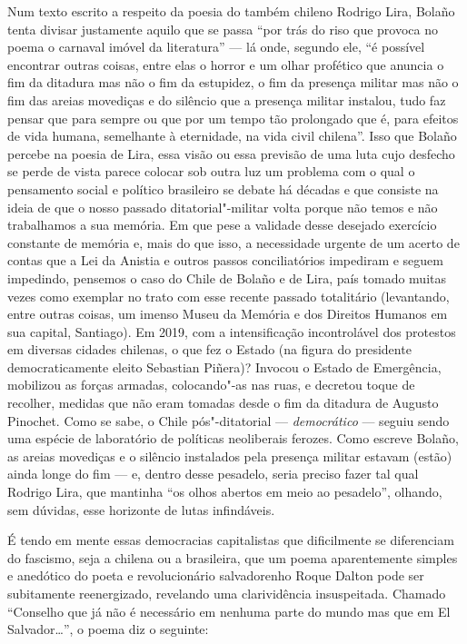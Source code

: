 \asterisc

Num texto escrito a respeito da poesia do também chileno Rodrigo Lira,
Bolaño tenta divisar justamente aquilo que se passa ``por trás do riso
que provoca no poema o carnaval imóvel da literatura'' --- lá onde,
segundo ele, ``é possível encontrar outras coisas, entre elas o horror e
um olhar profético que anuncia o fim da ditadura mas não o fim da
estupidez, o fim da presença militar mas não o fim das areias movediças
e do silêncio que a presença militar instalou, tudo faz pensar que para
sempre ou que por um tempo tão prolongado que é, para efeitos de vida
humana, semelhante à eternidade, na vida civil chilena''. Isso que
Bolaño percebe na poesia de Lira, essa visão ou essa previsão de uma
luta cujo desfecho se perde de vista parece colocar sob outra luz um
problema com o qual o pensamento social e político brasileiro se debate
há décadas e que consiste na ideia de que o nosso passado
ditatorial"-militar volta porque não temos e não trabalhamos a sua
memória. Em que pese a validade desse desejado exercício constante de
memória e, mais do que isso, a necessidade urgente de um acerto de
contas que a Lei da Anistia e outros passos conciliatórios impediram e
seguem impedindo, pensemos o caso do Chile de Bolaño e de Lira, país
tomado muitas vezes como exemplar no trato com esse recente passado
totalitário (levantando, entre outras coisas, um imenso Museu da Memória
e dos Direitos Humanos em sua capital, Santiago). Em 2019, com a
intensificação incontrolável dos protestos em diversas cidades chilenas,
o que fez o Estado (na figura do presidente democraticamente eleito
Sebastian Piñera)? Invocou o Estado de Emergência, mobilizou as forças
armadas, colocando"-as nas ruas, e decretou toque de recolher, medidas
que não eram tomadas desde o fim da ditadura de Augusto Pinochet. Como
se sabe, o Chile pós"-ditatorial --- \emph{democrático} --- seguiu sendo uma
espécie de laboratório de políticas neoliberais ferozes. Como escreve
Bolaño, as areias movediças e o silêncio instalados pela presença
militar estavam (estão) ainda longe do fim --- e, dentro desse pesadelo,
seria preciso fazer tal qual Rodrigo Lira, que mantinha ``os olhos
abertos em meio ao pesadelo'', olhando, sem dúvidas, esse horizonte de
lutas infindáveis.

\asterisc

É tendo em mente essas democracias capitalistas que dificilmente se
diferenciam do fascismo, seja a chilena ou a brasileira, que um poema
aparentemente simples e anedótico do poeta e revolucionário salvadorenho
Roque Dalton pode ser subitamente reenergizado, revelando uma
clarividência insuspeitada. Chamado ``Conselho que já não é necessário
em nenhuma parte do mundo mas que em El Salvador\ldots{}'', o poema diz
o seguinte:

